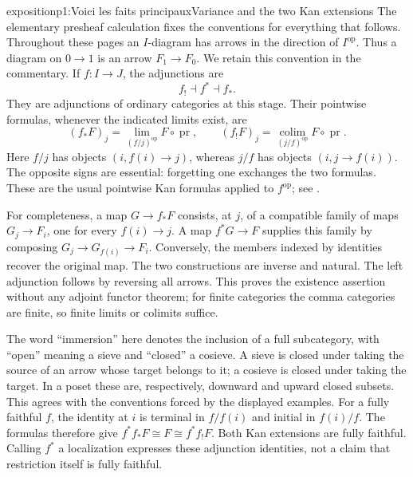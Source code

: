 
\begin{dcomment}{exposition}{p1:Voici les faits principaux}{Variance and the two Kan extensions}
The elementary presheaf calculation fixes the conventions for everything that follows. Throughout these pages an $I$-diagram has arrows in the direction of $I^{\mathrm{op}}$. Thus a diagram on $0\to1$ is an arrow $F_1\to F_0$. We retain this convention in the commentary. If $f:I\to J$, the adjunctions are
\[
 f_!\dashv f^*\dashv f_*.
\]
They are adjunctions of ordinary categories at this stage. Their pointwise formulas, whenever the indicated limits exist, are
\[
 (f_*F)_j=\lim_{(f/j)^{\mathrm{op}}}F\circ\operatorname{pr},
 \qquad
 (f_!F)_j=\operatorname*{colim}_{(j/f)^{\mathrm{op}}}F\circ\operatorname{pr}.
\]
Here $f/j$ has objects $(i,f(i)\to j)$, whereas $j/f$ has objects $(i,j\to f(i))$. The opposite signs are essential: forgetting one exchanges the two formulas. These are the usual pointwise Kan formulas applied to $f^{\mathrm{op}}$; see \citet[\S6.2]{Riehl2016}.

For completeness, a map $G\to f_*F$ consists, at $j$, of a compatible family of maps $G_j\to F_i$, one for every $f(i)\to j$. A map $f^*G\to F$ supplies this family by composing $G_j\to G_{f(i)}\to F_i$. Conversely, the members indexed by identities recover the original map. The two constructions are inverse and natural. The left adjunction follows by reversing all arrows. This proves the existence assertion without any adjoint functor theorem; for finite categories the comma categories are finite, so finite limits or colimits suffice.

The word ``immersion'' here denotes the inclusion of a full subcategory, with ``open'' meaning a sieve and ``closed'' a cosieve. A sieve is closed under taking the source of an arrow whose target belongs to it; a cosieve is closed under taking the target. In a poset these are, respectively, downward and upward closed subsets. This agrees with the conventions forced by the displayed examples. For a fully faithful $f$, the identity at $i$ is terminal in $f/f(i)$ and initial in $f(i)/f$. The formulas therefore give $f^*f_*F\cong F\cong f^*f_!F$. Both Kan extensions are fully faithful. Calling $f^*$ a localization expresses these adjunction identities, not a claim that restriction itself is fully faithful.
\end{dcomment}

